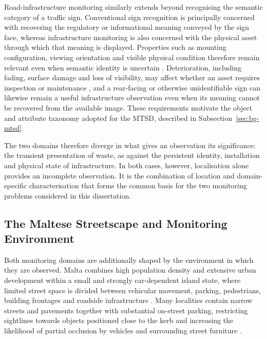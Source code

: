 Road-infrastructure monitoring similarly extends beyond recognising the semantic category of a traffic sign. Conventional sign recognition is principally concerned with recovering the regulatory or informational meaning conveyed by the sign face, whereas infrastructure monitoring is also concerned with the physical asset through which that meaning is displayed. Properties such as mounting configuration, viewing orientation and visible physical condition therefore remain relevant even when semantic identity is uncertain \cite{BG16-malta-sign-guidelines,BG16-eu-rism,BG29-sign-inspection}. Deterioration, including fading, surface damage and loss of visibility, may affect whether an asset requires inspection or maintenance \cite{BG14-sign-degradation,BG5-sign-monitoring}, and a rear-facing or otherwise unidentifiable sign can likewise remain a useful infrastructure observation even when its meaning cannot be recovered from the available image. These requirements motivate the object and attribute taxonomy adopted for the \gls{MTSD}, described in Subsection~\ref{sec:bg-mtsd}.

The two domains therefore diverge in what gives an observation its significance: the transient presentation of waste, as against the persistent identity, installation and physical state of infrastructure. In both cases, however, localisation alone provides an incomplete observation. It is the combination of location and domain-specific characterisation that forms the common basis for the two monitoring problems considered in this dissertation.

\subsection{The Maltese Streetscape and Monitoring Environment}
\label{sec:bg-malta}
Both monitoring domains are additionally shaped by the environment in which they are observed. Malta combines high population density and extensive urban development within a small and strongly car-dependent island state, where limited street space is divided between vehicular movement, parking, pedestrians, building frontages and roadside infrastructure \cite{I5-malta,I6-malta,BG19-malta-slow-streets}. Many localities contain narrow streets and pavements together with substantial on-street parking, restricting sightlines towards objects positioned close to the kerb and increasing the likelihood of partial occlusion by vehicles and surrounding street furniture \cite{BG18-malta-walkability,BG15-mdwd}.

